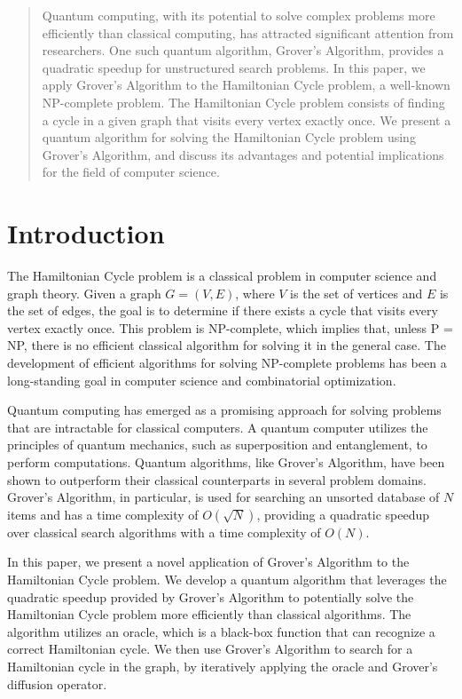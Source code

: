 \begin{abstract}
Quantum computing, with its potential to solve complex problems more efficiently than classical computing, has attracted significant attention from researchers. One such quantum algorithm, Grover's Algorithm, provides a quadratic speedup for unstructured search problems. In this paper, we apply Grover's Algorithm to the Hamiltonian Cycle problem, a well-known NP-complete problem. The Hamiltonian Cycle problem consists of finding a cycle in a given graph that visits every vertex exactly once. We present a quantum algorithm for solving the Hamiltonian Cycle problem using Grover's Algorithm, and discuss its advantages and potential implications for the field of computer science.

\end{abstract}

\section{Introduction}

The Hamiltonian Cycle problem is a classical problem in computer science and graph theory. Given a graph $G = (V, E)$, where $V$ is the set of vertices and $E$ is the set of edges, the goal is to determine if there exists a cycle that visits every vertex exactly once. This problem is NP-complete, which implies that, unless P = NP, there is no efficient classical algorithm for solving it in the general case. The development of efficient algorithms for solving NP-complete problems has been a long-standing goal in computer science and combinatorial optimization.

Quantum computing has emerged as a promising approach for solving problems that are intractable for classical computers. A quantum computer utilizes the principles of quantum mechanics, such as superposition and entanglement, to perform computations. Quantum algorithms, like Grover's Algorithm, have been shown to outperform their classical counterparts in several problem domains. Grover's Algorithm, in particular, is used for searching an unsorted database of $N$ items and has a time complexity of $O(\sqrt{N})$, providing a quadratic speedup over classical search algorithms with a time complexity of $O(N)$.

In this paper, we present a novel application of Grover's Algorithm to the Hamiltonian Cycle problem. We develop a quantum algorithm that leverages the quadratic speedup provided by Grover's Algorithm to potentially solve the Hamiltonian Cycle problem more efficiently than classical algorithms. The algorithm utilizes an oracle, which is a black-box function that can recognize a correct Hamiltonian cycle. We then use Grover's Algorithm to search for a Hamiltonian cycle in the graph, by iteratively applying the oracle and Grover's diffusion operator.

